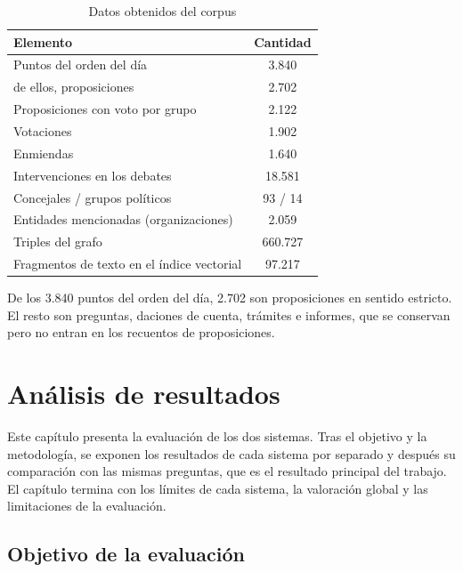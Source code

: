 \documentclass[11pt, a4paper]{report}
\begin{document}
	\begin{table}[H]
		\centering
		\begin{tabular}{|l|c|}
			\hline
			\rowcolor{tabla-header}
			\textbf{Elemento} & \textbf{Cantidad} \\
			\hline
			Puntos del orden del día & 3.840 \\
			\hline
			\rowcolor{fila-alterna}
			\quad de ellos, proposiciones & 2.702 \\
			\hline
			Proposiciones con voto por grupo & 2.122 \\
			\hline
			\rowcolor{fila-alterna}
			Votaciones & 1.902 \\
			\hline
			Enmiendas & 1.640 \\
			\hline
			\rowcolor{fila-alterna}
			Intervenciones en los debates & 18.581 \\
			\hline
			Concejales / grupos políticos & 93 / 14 \\
			\hline
			\rowcolor{fila-alterna}
			Entidades mencionadas (organizaciones) & 2.059 \\
			\hline
			Triples del grafo & 660.727 \\
			\hline
			\rowcolor{fila-alterna}
			Fragmentos de texto en el índice vectorial & 97.217 \\
			\hline
		\end{tabular}
		\caption{Datos obtenidos del corpus}
		\label{tab:corpus-estructurado}
	\end{table}

	De los 3.840 puntos del orden del día, 2.702 son proposiciones en sentido
	estricto. El resto son preguntas, daciones de cuenta, trámites e informes,
	que se conservan pero no entran en los recuentos de proposiciones.

	\chapter{Análisis de resultados}
	\label{ch:resultados}

	Este capítulo presenta la evaluación de los dos sistemas. Tras el objetivo y
	la metodología, se exponen los resultados de cada sistema por separado y después
	su comparación con las mismas preguntas, que es el resultado principal del trabajo. El capítulo termina con los límites de cada sistema, la
	valoración global y las limitaciones de la evaluación.

	\section{Objetivo de la evaluación}
\end{document}
